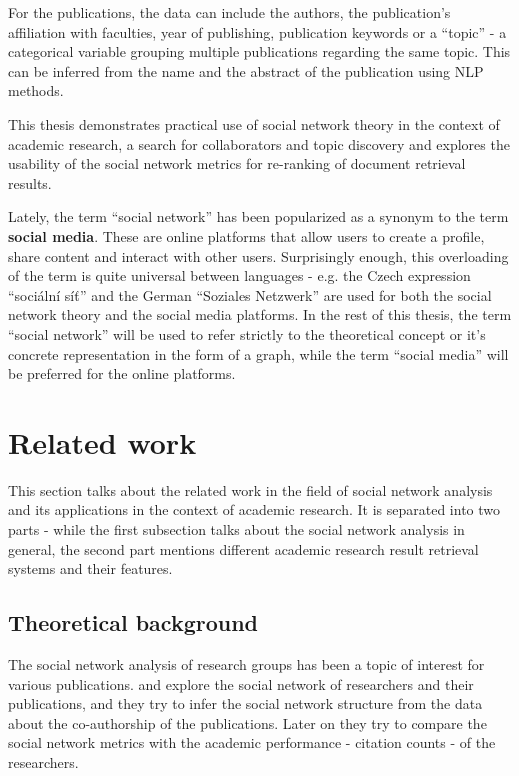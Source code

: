 For the publications, the data can include the authors, the publication's affiliation with faculties, year of publishing, publication keywords or a ``topic'' - a categorical variable grouping multiple publications regarding the same topic. This can be inferred from the name and the abstract of the publication using NLP methods.

This thesis demonstrates practical use of social network theory in the context of academic research, a search for collaborators and topic discovery and explores the usability of the social network metrics for re-ranking of document retrieval results.

Lately, the term ``social network'' has been popularized as a synonym to the term \textbf{social media}.
These are online platforms that allow users to create a profile, share content and interact with other users.
Surprisingly enough, this overloading of the term is quite universal between languages - e.g. the Czech expression ``sociální síť'' and the German ``Soziales Netzwerk'' are used for both the social network theory and the social media platforms.
In the rest of this thesis, the term ``social network'' will be used to refer strictly to the theoretical concept or it's concrete representation in the form of a graph, while the term ``social media'' will be preferred for the online platforms.

\section*{Related work}

This section talks about the related work in the field of social network analysis and its applications in the context of academic research.
It is separated into two parts - while the first subsection talks about the social network analysis in general, 
the second part mentions different academic research result retrieval systems and their features.

\subsection*{Theoretical background}

The social network analysis of research groups has been a topic of interest for various publications. 
\cite{ORDOOBADI2019S164} and \cite{CIMENLER2014667} explore the social network of researchers and their publications, and they try to infer the 
social network structure from the data about the co-authorship of the publications. 
Later on they try to compare the social network metrics with the academic performance - citation counts - of the researchers.

